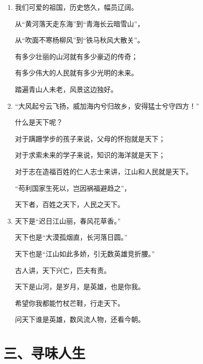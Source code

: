 \begin{enumerate}[leftmargin=*]
    \item 我们可爱的祖国，历史悠久，幅员辽阔。
    
    从“黄河落天走东海”到“青海长云暗雪山”，
    
    从“吹面不寒杨柳风”到“铁马秋风大散关”。
    
    有多少壮丽的山河就有多少豪迈的传奇；
    
    有多少伟大的人民就有多少光明的未来。
    
    踏遍青山人未老，风景这边独好。
    
    \item “大风起兮云飞扬，威加海内兮归故乡，安得猛士兮守四方！”
    
    什么是天下呢？
    
    对于蹒跚学步的孩子来说，父母的怀抱就是天下；
    
    对于求索未来的学子来说，知识的海洋就是天下；
    
    对于志在造福百姓的仁人志士来讲，江山和人民就是天下。
    
    “苟利国家生死以，岂因祸福避趋之”，
    
    天下者，百姓之天下，人民之天下。
    
    \item 天下是“迟日江山丽，春风花草香。”
    
    天下也是“大漠孤烟直，长河落日圆。”
    
    天下也是“江山如此多娇，引无数英雄竞折腰。”
    
    古人讲，天下兴亡，匹夫有责。
    
    天下是山河，是岁月，是英雄，也是你我。
    
    希望你我都能竹杖芒鞋，行走天下。
    
    问天下谁是英雄，数风流人物，还看今朝。
\end{enumerate}

\newpage

\section*{三、寻味人生}

